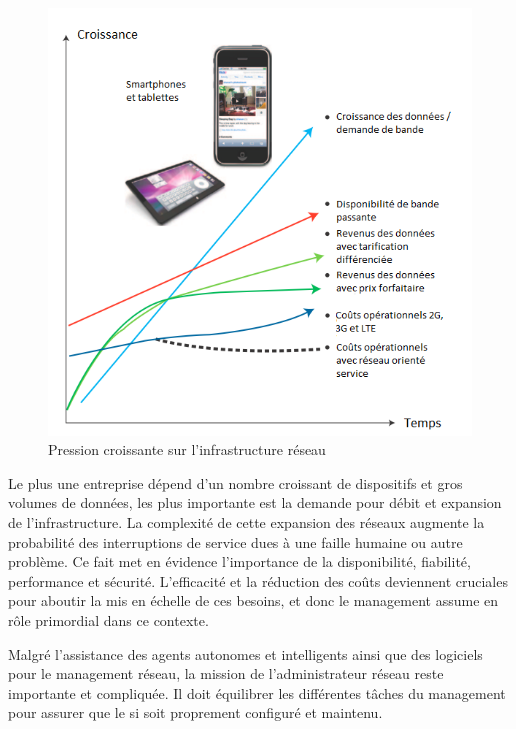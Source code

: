 \begin{figure}[!h] %
\includegraphics[width=15cm]{images/IncreasingPressureOnNetworkInfra2.png} %
\caption{ Pression croissante sur l'infrastructure réseau \cite{IBMManagingGrowingPainsNeed}} %
\label{imgPressure} %
\end{figure} %

Le plus une entreprise dépend d'un nombre croissant de dispositifs et gros volumes de données, les plus importante est la demande pour débit et expansion de l'infrastructure. La complexité de cette expansion des réseaux augmente la probabilité des interruptions de service dues à une faille humaine ou autre problème. Ce fait met en évidence l'importance de la disponibilité, fiabilité, performance et sécurité. L'efficacité et la réduction des coûts deviennent cruciales pour aboutir la mis en échelle de ces besoins, et donc le management assume en rôle primordial dans ce contexte. \cite{IBMManagingGrowingPainsNeed}
 

Malgré l'assistance des agents autonomes et intelligents ainsi que des logiciels pour le management réseau, la mission de l'administrateur réseau reste importante et compliquée. Il doit équilibrer les différentes tâches du management pour assurer que le \gls{si} soit proprement configuré et maintenu. \cite{CentralIssuesNetworkManagementConclusion}

